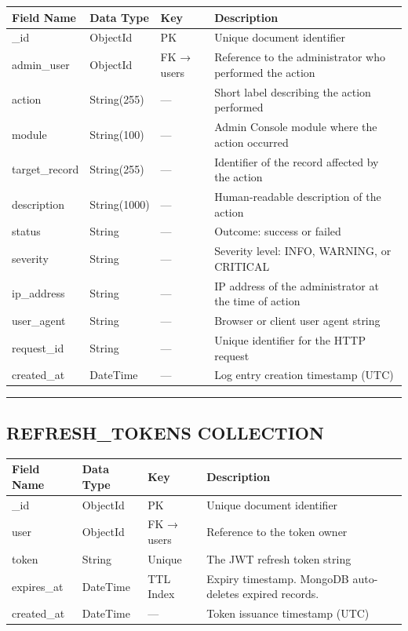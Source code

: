 \documentclass[12pt]{article}
\begin{document}
\begin{longtable}{|p{}|p{}|p{}|p{}|}
\hline
\textbf{Field Name} & \textbf{Data Type} & \textbf{Key} & \textbf{Description} \\ \hline
\endhead
\_id & ObjectId & PK & Unique document identifier \\ \hline
admin\_user & ObjectId & FK → users & Reference to the administrator who performed the action \\ \hline
action & String(255) & — & Short label describing the action performed \\ \hline
module & String(100) & — & Admin Console module where the action occurred \\ \hline
target\_record & String(255) & — & Identifier of the record affected by the action \\ \hline
description & String(1000) & — & Human-readable description of the action \\ \hline
status & String & — & Outcome: success or failed \\ \hline
severity & String & — & Severity level: INFO, WARNING, or CRITICAL \\ \hline
ip\_address & String & — & IP address of the administrator at the time of action \\ \hline
user\_agent & String & — & Browser or client user agent string \\ \hline
request\_id & String & — & Unique identifier for the HTTP request \\ \hline
created\_at & DateTime & — & Log entry creation timestamp (UTC) \\ \hline
\end{longtable}


\noindent\rule{\textwidth}{0.4pt}

\subsection{REFRESH\_TOKENS COLLECTION}


\begin{longtable}{|p{}|p{}|p{}|p{}|}
\hline
\textbf{Field Name} & \textbf{Data Type} & \textbf{Key} & \textbf{Description} \\ \hline
\endhead
\_id & ObjectId & PK & Unique document identifier \\ \hline
user & ObjectId & FK → users & Reference to the token owner \\ \hline
token & String & Unique & The JWT refresh token string \\ \hline
expires\_at & DateTime & TTL Index & Expiry timestamp. MongoDB auto-deletes expired records. \\ \hline
created\_at & DateTime & — & Token issuance timestamp (UTC) \\ \hline
\end{longtable}
\end{document}

